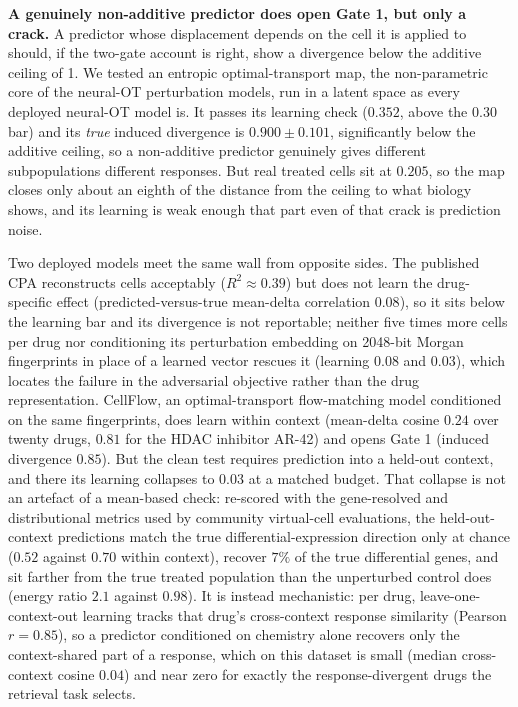\documentclass[11pt,letterpaper]{article}
\begin{document}
\textbf{A genuinely non-additive predictor does open Gate 1, but only a crack.} A predictor whose
displacement depends on the cell it is applied to should, if the two-gate account is right, show a
divergence below the additive ceiling of 1. We tested an entropic optimal-transport map, the
non-parametric core of the neural-OT perturbation models\cite{CellOT,Departures}, run in a latent
space as every deployed neural-OT model is. It passes its learning check ($0.352$, above the $0.30$
bar) and its \emph{true} induced divergence is $\mathbf{0.900 \pm 0.101}$, significantly below the
additive ceiling, so a non-additive predictor genuinely gives different subpopulations different
responses. But real treated cells sit at $0.205$, so the map closes only about an eighth of the
distance from the ceiling to what biology shows, and its learning is weak enough that part even of
that crack is prediction noise.

Two deployed models meet the same wall from opposite sides. The published CPA reconstructs cells
acceptably ($R^2 \approx 0.39$) but does not learn the drug-specific effect (predicted-versus-true
mean-delta correlation $0.08$), so it sits below the learning bar and its divergence is not
reportable; neither five times more cells per drug nor conditioning its perturbation embedding on
2048-bit Morgan fingerprints in place of a learned vector rescues it (learning $0.08$ and $0.03$),
which locates the failure in the adversarial objective rather than the drug representation.
CellFlow\cite{CellFlow}, an optimal-transport flow-matching model conditioned on the same
fingerprints, does learn within context (mean-delta cosine $0.24$ over twenty drugs, $0.81$ for the
HDAC inhibitor AR-42) and opens Gate 1 (induced divergence $0.85$). But the clean test requires
prediction into a held-out context, and there its learning collapses to $0.03$ at a matched budget.
That collapse is not an artefact of a mean-based check: re-scored with the gene-resolved and
distributional metrics used by community virtual-cell evaluations\cite{VirtualCellChallenge}, the held-out-context predictions match the true differential-expression
direction only at chance ($0.52$ against $0.70$ within context), recover $7\%$ of the true
differential genes, and sit farther from the true treated population than the unperturbed control
does (energy ratio $2.1$ against $0.98$). It is instead mechanistic: per drug, leave-one-context-out
learning tracks that drug's cross-context response similarity (Pearson $r = 0.85$), so a predictor
conditioned on chemistry alone recovers only the context-shared part of a response, which on this
dataset is small (median cross-context cosine $0.04$) and near zero for exactly the
response-divergent drugs the retrieval task selects.
\end{document}
